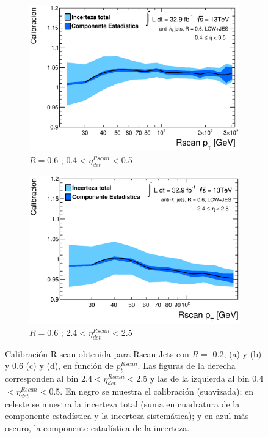 \begin{figure}[ht]
\begin{subfigure}[b]{0.495\textwidth}
        \centering
        \includegraphics[width=\textwidth]{images/Final6LC/Calibration_Eta_49.eps}
        \caption{$R=$0.6 ; 0.4$<\eta^{Rscan}_{det}<$0.5}
    \end{subfigure}
    \hfill
    \begin{subfigure}[b]{0.495\textwidth}
        \centering
        \includegraphics[width=\textwidth]{images/Final6LC/Calibration_Eta_69.eps}
        \caption{$R=$0.6 ; 2.4$<\eta^{Rscan}_{det}<$2.5}
    \end{subfigure}
    \caption{ Calibración R-scan obtenida para Rscan Jets con $R=$ 0.2, (a) y (b) y 0.6 (c) y (d), en función de $p_t^{Rscan}$. Las figuras de la derecha corresponden al bin 2.4$<\eta^{Rscan}_{det}<$2.5 y las de la izquierda al bin 0.4$<\eta^{Rscan}_{det}<$0.5. En negro se muestra el calibración (suavizada); en celeste se muestra la incerteza total (suma en cuadratura de la componente estadística y la incerteza sistemática); y en azul más oscuro, la componente estadística de la incerteza.} 
    \label{fig:FinalCalibration}
\end{figure}



\afterpage{\null\newpage}